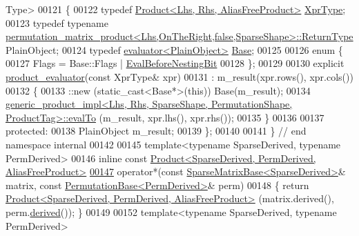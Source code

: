 \begin{DoxyCode}
      Type>
00121 \{
00122   \textcolor{keyword}{typedef} \hyperlink{group___core___module_class_eigen_1_1_product}{Product<Lhs, Rhs, AliasFreeProduct>} 
      \hyperlink{group___core___module_class_eigen_1_1_product}{XprType};
00123   \textcolor{keyword}{typedef} \textcolor{keyword}{typename} 
      \hyperlink{struct_eigen_1_1internal_1_1permutation__matrix__product}{permutation\_matrix\_product<Lhs,OnTheRight,false,SparseShape>::ReturnType}
       PlainObject;
00124   \textcolor{keyword}{typedef} \hyperlink{struct_eigen_1_1internal_1_1evaluator}{evaluator<PlainObject>} \hyperlink{struct_eigen_1_1internal_1_1evaluator}{Base};
00125 
00126   \textcolor{keyword}{enum} \{
00127     Flags = Base::Flags | \hyperlink{group__flags_gaa34e83bae46a8eeae4e69ebe3aaecbed}{EvalBeforeNestingBit}
00128   \};
00129 
00130   \textcolor{keyword}{explicit} \hyperlink{struct_eigen_1_1internal_1_1product__evaluator}{product\_evaluator}(\textcolor{keyword}{const} XprType& xpr)
00131     : m\_result(xpr.rows(), xpr.cols())
00132   \{
00133     ::new (static\_cast<Base*>(\textcolor{keyword}{this})) Base(m\_result);
00134     
      \hyperlink{struct_eigen_1_1internal_1_1generic__product__impl}{generic\_product\_impl<Lhs, Rhs, SparseShape, PermutationShape, ProductTag>::evalTo}
      (m\_result, xpr.lhs(), xpr.rhs());
00135   \}
00136 
00137 \textcolor{keyword}{protected}:
00138   PlainObject m\_result;
00139 \};
00140 
00141 \} \textcolor{comment}{// end namespace internal}
00142 
00145 \textcolor{keyword}{template}<\textcolor{keyword}{typename} SparseDerived, \textcolor{keyword}{typename} PermDerived>
00146 \textcolor{keyword}{inline} \textcolor{keyword}{const} \hyperlink{group___core___module_class_eigen_1_1_product}{Product<SparseDerived, PermDerived, AliasFreeProduct>}
\hyperlink{namespace_eigen_ad798a8be8b0c5f94a29b119898d8d83d}{00147} operator*(\textcolor{keyword}{const} \hyperlink{group___sparse_core___module_class_eigen_1_1_sparse_matrix_base}{SparseMatrixBase<SparseDerived>}& matrix, \textcolor{keyword}{const} 
      \hyperlink{group___core___module_class_eigen_1_1_permutation_base}{PermutationBase<PermDerived>}& perm)
00148 \{ \textcolor{keywordflow}{return} \hyperlink{group___core___module_class_eigen_1_1_product}{Product<SparseDerived, PermDerived, AliasFreeProduct>}
      (matrix.derived(), perm.\hyperlink{group___core___module_a324b16961a11d2ecfd2d1b7dd7946545}{derived}()); \}
00149 
00152 \textcolor{keyword}{template}<\textcolor{keyword}{typename} SparseDerived, \textcolor{keyword}{typename} PermDerived>

\end{DoxyCode}
